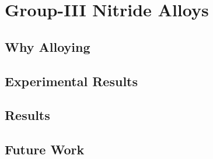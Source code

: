 
\section{Group-III Nitride Alloys}\label{group-iii-nitride-alloys}

\subsection{Why Alloying}\label{why-alloying}

\subsection{Experimental Results}\label{experimental-results}

\subsection{Results}\label{results}

\subsection{Future Work}\label{future-work}
